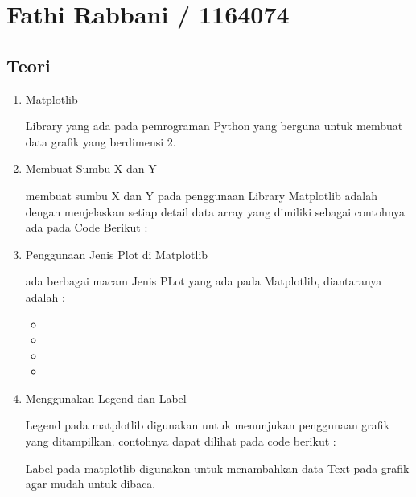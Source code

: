\section{Fathi Rabbani / 1164074}
\subsection{Teori}
\begin{enumerate}
\item Matplotlib
\par Library yang ada pada pemrograman Python yang berguna untuk membuat data grafik yang berdimensi 2.

\item Membuat Sumbu X dan Y
\par membuat sumbu X dan Y pada penggunaan Library Matplotlib adalah dengan menjelaskan setiap detail data array yang dimiliki sebagai contohnya ada pada Code Berikut : 


\item Penggunaan Jenis Plot di Matplotlib
\par ada berbagai macam Jenis PLot yang ada pada Matplotlib, diantaranya adalah :
\begin{itemize}
\item 
\item 
\item 
\item 
\end{itemize}

\item Menggunakan Legend dan Label
\par Legend pada matplotlib digunakan untuk menunjukan penggunaan grafik yang ditampilkan. contohnya dapat dilihat pada code berikut : 


\par Label pada matplotlib digunakan untuk menambahkan data Text pada grafik agar mudah untuk dibaca.



\end{enumerate}
